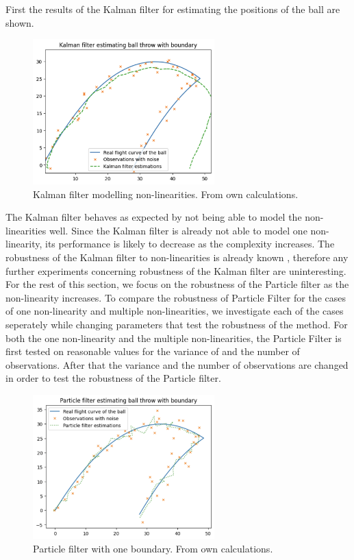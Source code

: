 \documentclass[conference]{IEEEtran}
\begin{document}
First the results of the Kalman filter for estimating the positions of the ball are shown.   
\begin{figure}
	\centering
	\includegraphics[width=70mm]{figs/kalman-filter.png}
	\caption{Kalman filter modelling non-linearities. From own calculations.}
	\label{fig:kalman-filter}
\end{figure}
The Kalman filter behaves as expected by not being able to model the non-linearities well.
Since the Kalman filter is already not able to model one non-linearity, its performance is likely to decrease as the complexity increases.
The robustness of the Kalman filter to non-linearities is already known \cite{}, therefore any further experiments concerning robustness of the Kalman filter are uninteresting. \\
For the rest of this section, we focus on the robustness of the Particle filter as the non-linearity increases. 
To compare the robustness of Particle Filter for the cases of one non-linearity and multiple non-linearities, we investigate each of the cases seperately while changing parameters that test the robustness of the method. 
For both the one non-linearity and the multiple non-linearities, the Particle Filter is first tested on reasonable values for the variance of and the number of observations. 
After that the variance and the number of observations are changed in order to test the robustness of the Particle filter. 
\begin{figure}
	\centering
	\includegraphics[width=70mm]{figs/particle-filter-one-boundary}
	\caption{Particle filter with one boundary. From own calculations.}
	\label{fig:particle-filter-one-boundary}
\end{figure}
\end{document}

